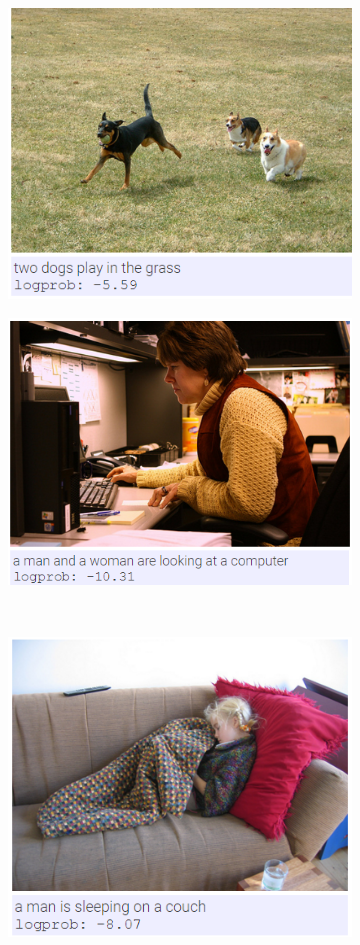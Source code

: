 	\begin{figure}
		\begin{subfigure}{.5\textwidth}
			\centering
			\includegraphics[width=.8\linewidth]{Images/Results/Intermediate/dogs_in_grass}
			\label{fig:intermediateresults1}
		\end{subfigure}%
		\begin{subfigure}{.5\textwidth}
			\centering
			\includegraphics[width=.8\linewidth]{Images/Results/Intermediate/looing_at_computer}
			\label{fig:intermediateresults2}
		\end{subfigure}\\
		\begin{subfigure}{.5\textwidth}
			\centering
			\includegraphics[width=.8\linewidth]{Images/Results/Intermediate/sleeping_couch}

\end{subfigure}
\end{figure}
